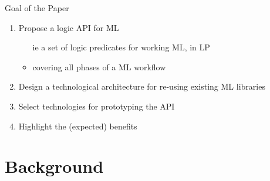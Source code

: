\documentclass[presentation]{beamer}\mode<presentation>{\usetheme{AMSBolognaFC}}
\begin{document}
\begin{frame}{Goal of the Paper}

    \begin{enumerate}
        \item Propose a logic API for ML
        \begin{itemize}
            \item[ie] a set of logic predicates for working ML, in LP
            \item covering all phases of a ML workflow
        \end{itemize}

        \vfill

        \item Design a technological architecture for re-using existing ML libraries

        \vfill

        \item Select technologies for prototyping the API

        \vfill

        \item Highlight the (expected) benefits
    \end{enumerate}

\end{frame}

\section{Background}
\end{document}
